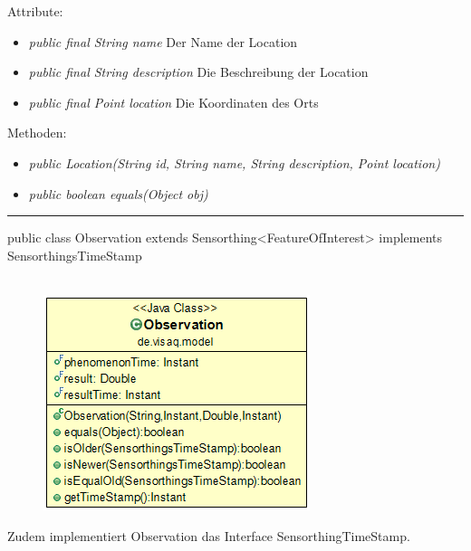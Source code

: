 Attribute:
\begin{itemize}
	\item \emph{public final String name} Der Name der Location
	\item \emph{public final String description} Die Beschreibung der Location
	\item \emph{public final Point location} Die Koordinaten des Orts
\end{itemize}
Methoden:
\begin{itemize}
	\item \emph{public Location(String id, String name, String description, Point location)} 
	\item \emph{public boolean equals(Object obj)} 
\end{itemize}
\clearpage %
\rule{\textwidth}{0.4pt}
public class Observation extends Sensorthing<FeatureOfInterest> implements SensorthingsTimeStamp
\\\\
\begin{minipage}{0.3\textwidth}
	\begin{figure}[H]
		\includegraphics[scale = 0.5
		]{media/frontend/model/ObservationClass.png}
	\end{figure}
\end{minipage} \hfill
\begin{minipage}{0.6\textwidth}
	 Zudem implementiert Observation das Interface SensorthingTimeStamp.
\end{minipage}

